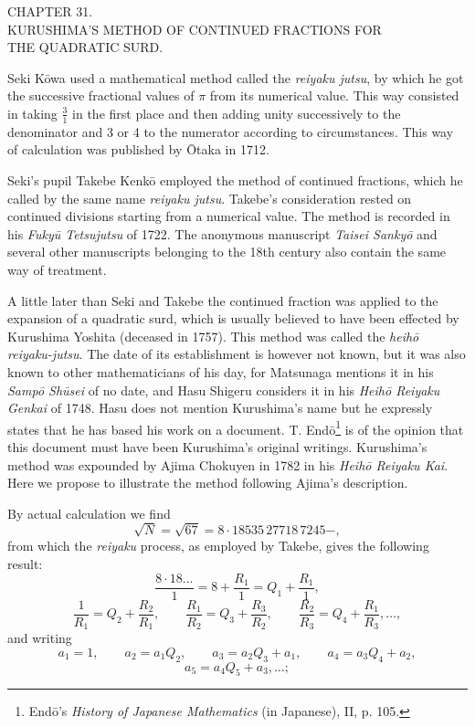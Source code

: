 \documentclass[11pt]{article}
\newcommand{\scanpage}[2]{\clearpage\setcounter{footnote}{0}\noindent{\footnotesize\color{gray}PDF page #1 · #2}\par\medskip}
\newcommand{\scanfooter}{}
\newcommand{\dd}{\mathbin{\cdot}}
\begin{document}
\scanpage{0237}{Chapter 31 opening, printed page 223}
\begin{center}
CHAPTER 31.\\[1mm]
KURUSHIMA'S METHOD OF CONTINUED FRACTIONS FOR\\
THE QUADRATIC SURD.
\end{center}

Seki Kōwa used a mathematical method called the \emph{reiyaku jutsu}, by which he got the successive fractional values of $\pi$ from its numerical value. This way consisted in taking $\frac31$ in the first place and then adding unity successively to the denominator and 3 or 4 to the numerator according to circumstances. This way of calculation was published by Ōtaka in 1712.

Seki's pupil Takebe Kenkō employed the method of continued fractions, which he called by the same name \emph{reiyaku jutsu}. Takebe's consideration rested on continued divisions starting from a numerical value. The method is recorded in his \emph{Fukyū Tetsujutsu} of 1722. The anonymous manuscript \emph{Taisei Sankyō} and several other manuscripts belonging to the 18th century also contain the same way of treatment.

A little later than Seki and Takebe the continued fraction was applied to the expansion of a quadratic surd, which is usually believed to have been effected by Kurushima Yoshita (deceased in 1757). This method was called the \emph{heihō reiyaku-jutsu}. The date of its establishment is however not known, but it was also known to other mathematicians of his day, for Matsunaga mentions it in his \emph{Sampō Shūsei} of no date, and Hasu Shigeru considers it in his \emph{Heihō Reiyaku Genkai} of 1748. Hasu does not mention Kurushima's name but he expressly states that he has based his work on a document. T. Endō\footnote{Endō's \emph{History of Japanese Mathematics} (in Japanese), II, p. 105.} is of the opinion that this document must have been Kurushima's original writings. Kurushima's method was expounded by Ajima Chokuyen in 1782 in his \emph{Heihō Reiyaku Kai}. Here we propose to illustrate the method following Ajima's description.

By actual calculation we find
\[
\sqrt N=\sqrt{67}=8\dd18535\,27718\,7245-,
\]
from which the \emph{reiyaku} process, as employed by Takebe, gives the following result:
\[
\frac{8\dd18\ldots}{1}=8+\frac{R_1}{1}=Q_1+\frac{R_1}{1},
\]
\[
\frac1{R_1}=Q_2+\frac{R_2}{R_1},\qquad
\frac{R_1}{R_2}=Q_3+\frac{R_3}{R_2},\qquad
\frac{R_2}{R_3}=Q_4+\frac{R_1}{R_3},\ldots,
\]
and writing
\[
a_1=1,\qquad a_2=a_1Q_2,\qquad a_3=a_2Q_3+a_1,\qquad a_4=a_3Q_4+a_2,
\]
\[
a_5=a_4Q_5+a_3,\ldots;
\]
\scanfooter
\end{document}
